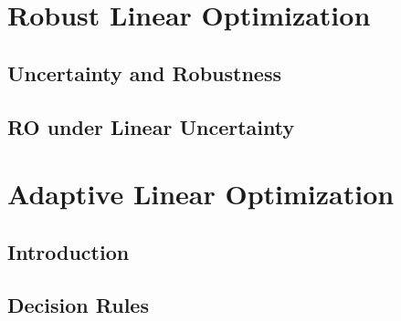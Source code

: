 \documentclass{bookest}
\begin{document}
	

	\tableofcontents
	
	\part{Robust Linear Optimization}
	
	\chapter{Uncertainty and Robustness} \label{chapter_1}
	
	
	\chapter{RO under Linear Uncertainty} \label{chapter_2}
	
	

		
	
	\part{Adaptive Linear Optimization} \label{part_2}
		
	\chapter{Introduction}
	
	
	\chapter{Decision Rules}
	
	
	
\end{document}

